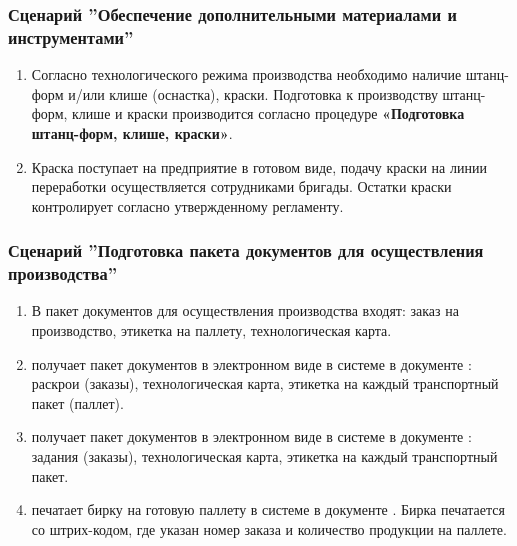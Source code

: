 \subsubsection{Сценарий ''Обеспечение дополнительными материалами и инструментами''}
\label{bp:production_5}

\begin{enumerate}
\item	Согласно технологического режима производства необходимо наличие штанц-форм и/или клише (оснастка), краски. Подготовка к производству штанц-форм, клише и краски производится согласно процедуре \textbf{«Подготовка штанц-форм, клише, краски»}.

\item Краска поступает на предприятие в готовом виде, подачу краски на линии переработки осуществляется сотрудниками бригады. Остатки краски \kladovshik контролирует согласно утвержденному регламенту.

\end{enumerate}



\subsubsection{Сценарий ''Подготовка пакета документов для осуществления производства''}
\label{bp:production_6}

\begin{enumerate}
\item	В пакет документов для осуществления производства входят: заказ на производство, этикетка на паллету, технологическая карта.
\item \gaoperator получает пакет документов в электронном виде в системе \gofro в документе : раскрои (заказы), технологическая карта, этикетка на каждый транспортный пакет (паллет).
\item \operator получает пакет документов в электронном виде в системе \gofro в документе : задания (заказы), технологическая карта, этикетка на каждый транспортный пакет.
\item \operator печатает бирку на готовую паллету в системе \gofro в документе . 
Бирка печатается со штрих-кодом, где указан номер заказа и количество продукции на паллете.

\end{enumerate}


